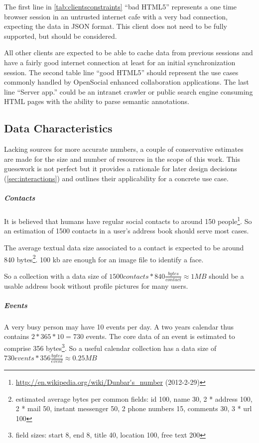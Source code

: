 \documentclass[11pt,a4paper,headsepline,twoside]{scrartcl}		%
\newcommand{\citeurl}[2]{\url{#1} (#2)}
\begin{document}
The first line in \autoref{tab:clientsconstraints} ``bad HTML5'' represents a
one time browser session in an untrusted internet cafe with a very bad
connection, expecting the data in JSON format. This client does not need to be
fully supported, but should be considered.

All other clients are expected to be able to cache data from previous sessions
and have a fairly good internet connection at least for an initial
synchronization session. The second table line ``good HTML5'' should represent
the use cases commonly handled by OpenSocial enhanced collaboration
applications. The last line ``Server app.'' could be an intranet crawler or
public search engine consuming HTML pages with the ability to parse semantic
annotations.

\subsection{Data Characteristics}
\label{sec:data-characteristics}

Lacking sources for more accurate numbers, a couple of conservative estimates
are made for the size and number of resources in the scope of this work. This
guesswork is not perfect but it provides a rationale for later design
decisions (\autoref{sec:interactions}) and outlines their applicability for a
concrete use case.

\subparagraph{Contacts}

It is believed that humans have regular social contacts to around 150
people\footnote{\citeurl{http://en.wikipedia.org/wiki/Dunbar's_number}{2012-2-29}}. So
an estimation of 1500 contacts in a user's address book should serve most cases.

The average textual data size associated to a contact is expected to be around
840 bytes\footnote{estimated average bytes per common fields: id 100, name 30, 2 *
  address 100, 2 * mail 50, instant messenger 50, 2 phone numbers 15, comments
  30, 3 * url 100}. 100 kb are enough for an image file to identify a face.

So a collection with a data size of $1500 contacts * 840 \frac{bytes}{contact}
\approx 1MB$ should be a usable address book without profile pictures for many
users.

\subparagraph{Events}

A very busy person may have 10 events per day. A two years calendar thus
contains $2*365*10=730$ events. The core data of an event is estimated to
comprise 356 bytes\footnote{field sizes: start 8, end 8, title 40, location 100,
  free text 200}. So a useful calendar collection has a data size of $730 events
* 356 \frac{bytes}{event} \approx 0.25 MB$
\end{document}
